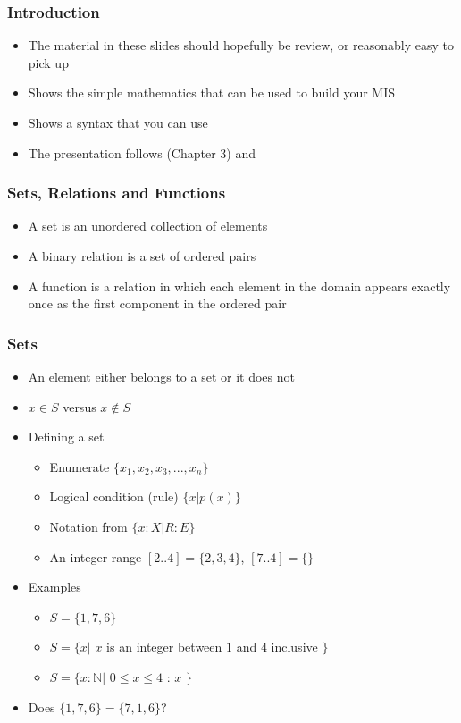 \documentclass[t,12pt,numbers,fleqn]{beamer}
\begin{document}


\begin{frame}
\frametitle{Introduction}
\begin{itemize}
\item The material in these slides should hopefully be review, or
  reasonably easy to pick up
\item Shows the simple mathematics that can be used to build your MIS
\item Shows a syntax that you can use
\item The presentation follows \cite{HoffmanAndStrooper1995} (Chapter
  3) and \cite{GriesAndSchneider1993}
\end{itemize}
\end{frame}


\begin{frame}
\frametitle{Sets, Relations and Functions}
\begin{itemize}
\item A set is an unordered collection of elements
\item A binary relation is a set of ordered pairs
\item A function is a relation in which each element in the domain
  appears exactly once as the first component in the ordered pair
\end{itemize}
\end{frame}


\begin{frame}
\frametitle{Sets}
\begin{itemize}
\item An element either belongs to a set or it does not
\item $x \in S$ versus $x \notin S$
\item Defining a set
\begin{itemize}
\item Enumerate $\{ x_1, x_2, x_3, ..., x_n \}$
\item Logical condition (rule) $\{x | p(x) \}$
\item Notation from \cite{GriesAndSchneider1993} $\{x: X | R : E \}$
\item An integer range $[2 .. 4] = \{2, 3, 4\}$, $[7 .. 4] = \{\}$
\end{itemize}
\item Examples
\begin{itemize}
\item $S = \{ 1, 7, 6 \}$
\item $S = \{ x |$ $x$ is an integer between $1$ and $4$ inclusive
  $\}$
\item $S = \{ x: \mathbb{N} |$ $0 \leq x \leq 4$ : $x$ $\}$
\end{itemize}
\item Does $\{ 1, 7, 6 \} = \{ 7, 1, 6 \}$?
\end{itemize}
\end{frame}
\end{document}
